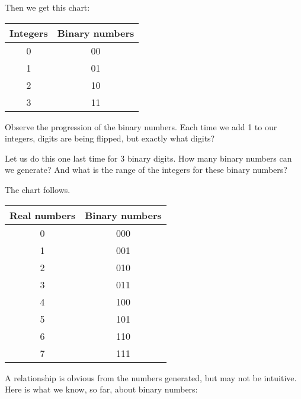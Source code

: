 \documentclass[12pt]{article}
\begin{document}
    Then we get this chart:

    \begin{center}
        \begin{tabular}{|c|c|}
          \hline
          Integers & Binary numbers \\
          \hline
          0 & 00 \\
          1 & 01 \\
          2 & 10 \\
          3 & 11 \\         
          \hline
                     
        \end{tabular}
    \end{center}

    Observe the progression of the binary numbers. Each time we add 1 to our integers, digits
    are being flipped, but exactly what digits?

    Let us do this one last time for 3 binary digits. How many binary numbers can we generate?
    And what is the range of the integers for these binary numbers?

    The chart follows.

        \begin{center}
        \begin{tabular}{|c|c|}
          \hline
          Real numbers & Binary numbers \\
          \hline
          0 & 000 \\
          1 & 001 \\
          2 & 010  \\
          3 & 011 \\
          4 & 100 \\
          5 & 101 \\
          6 & 110 \\
          7 & 111 \\
          \hline
                     
        \end{tabular}
    \end{center}

    A relationship is obvious from the numbers generated, but may not be intuitive.
    Here is what we know, so far, about binary numbers:

    \newpage
\end{document}
